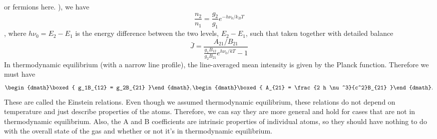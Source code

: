 \begin{enumerate}
{        or fermions here.
      }), we have
       \begin{dmath}
        \frac{n_2}{n_1} = \frac{g_2}{g_1} e^{-h\nu_0 / k_B T}
       \end{dmath},
       where $h\nu_0 = E_2-E_1$ is the energy difference between the two levels,
       $E_2 - E_1$, such that taken together with detailed balance
       \begin{dmath}
        \bar J = \frac{A_{21}/B_{21}}{\frac{g_1B_{12}}{g_2B_{21}}e^{h\nu_0/kT}-1}
       \end{dmath}
       In thermodynamic equilibrium (with a narrow line profile), the
       line-averaged mean intensity is given by the Planck function.  Therefore we must have
       \begin{dgroup}
       \begin{dmath}\boxed{
        g_1B_{12} = g_2B_{21}
       }\end{dmath},
       \begin{dmath}\boxed{
        A_{21} = \frac{2 h \nu^3}{c^2}B_{21}
       }\end{dmath}.
       \end{dgroup}
       These are called the Einstein relations.
      Even though we assumed thermodynamic equilibrium, these relations do not depend on
      temperature and just describe properties of the atoms. Therefore, we can say they are more
      general and hold for cases that are not in thermodynamic equilibrium.
      Also, the A and B coefficients are intrinsic properties of individual 
      atoms, so they should have nothing to do with the overall state of the 
      gas and whether or not it's in thermodynamic equilibrium.


\end{enumerate}
